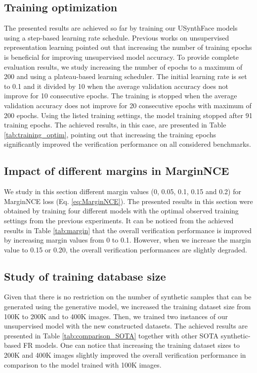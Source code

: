 \documentclass[10pt,twocolumn,letterpaper]{ieeeconf}
\begin{document}
\subsection{Training optimization}
\label{sec:abl_training_optim}
The presented results are achieved so far by training our USynthFace models using a step-based learning rate schedule. Previous works \cite{MocoV2} on unsupervised representation learning pointed out that increasing the number of training epochs is beneficial for improving unsupervised model accuracy.  
To provide complete evaluation results, we study increasing the number of epochs to a maximum of 200 \cite{MocoV2} and using a plateau-based learning scheduler. The  initial learning rate is set to 0.1 and it divided by 10 when the average validation accuracy does not improve for 10 consecutive epochs. The training is stopped when the average validation accuracy does not improve for 20 consecutive epochs with maximum of 200 epochs. Using the listed training settings, the model training stopped after 91 training epochs. The achieved results, in this case, are presented in Table \ref{tab:training_optim}, pointing out that increasing the training epochs significantly improved the verification performance on all considered benchmarks. 







\subsection{Impact of different margins in MarginNCE}
\label{sec:abl_margin}
We study in this section different margin values (0, 0.05, 0.1, 0.15 and 0.2) for MarginNCE loss (Eq. \ref{eq:MarginNCE}). The presented results in this section were obtained by training four different models with the optimal observed training settings from the previous experiments. It can be noticed from the achieved results in Table \ref{tab:margin} that the overall verification performance is improved by increasing margin values from 0 to 0.1. However, when we increase the margin value to 0.15 or 0.20, the overall verification performances are slightly degraded.





\subsection{Study of training database size}
\label{sec:abl_db_size}
Given that there is no restriction on the number of synthetic samples that can be generated using the generative model, we increased the training dataset size from 100K to 200K and to 400K images. Then, we trained two instances of our unsupervised model with the new constructed datasets. The achieved results are presented in Table \ref{tab:comparison_SOTA} together with other SOTA synthetic-based FR models. One can notice that increasing the training dataset sizes to 200K and 400K images slightly improved the overall verification performance in comparison to the model trained with 100K images. 
\end{document}
